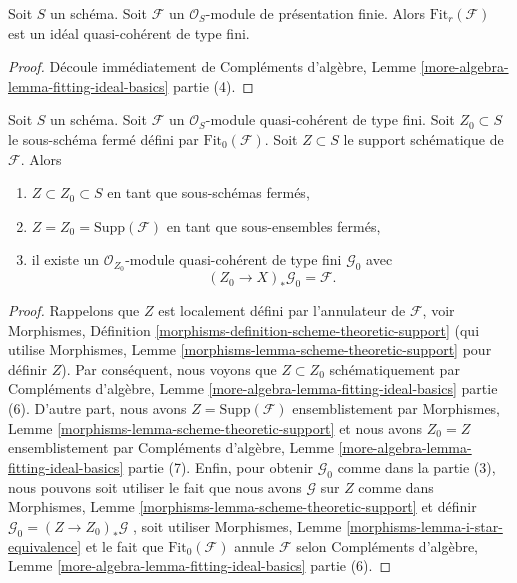 \begin{lemma}
\label{lemma-fitting-ideal-of-finitely-presented}
Soit  $S$  un schéma. Soit  $\mathcal{F}$  un  $\mathcal{O}_S$-module de
présentation finie. Alors  $\text{Fit}_r(\mathcal{F})$  est un idéal quasi-cohérent de type fini.
\end{lemma}

\begin{proof}
Découle immédiatement de Compléments d'algèbre, Lemme  \ref{more-algebra-lemma-fitting-ideal-basics}  partie (4).
\end{proof}

\begin{lemma}
\label{lemma-on-subscheme-cut-out-by-Fit-0}
Soit  $S$  un schéma. Soit  $\mathcal{F}$  un  $\mathcal{O}_S$-module
quasi-cohérent de type fini. Soit  $Z_0 \subset S$  le sous-schéma fermé défini par
 $\text{Fit}_0(\mathcal{F})$. Soit  $Z \subset S$  le support schématique de  $\mathcal{F}$. Alors
\begin{enumerate}
\item $Z \subset Z_0 \subset S$  en tant que sous-schémas fermés,
\item $Z = Z_0 = \text{Supp}(\mathcal{F})$  en tant que sous-ensembles fermés,
\item il existe un  $\mathcal{O}_{Z_0}$-module quasi-cohérent de type fini  $\mathcal{G}_0$  avec
$$
(Z_0 \to X)_*\mathcal{G}_0 = \mathcal{F}.
$$
\end{enumerate}
\end{lemma}

\begin{proof}
Rappelons que  $Z$  est localement défini par l'annulateur de  $\mathcal{F}$,
voir Morphismes, Définition  \ref{morphisms-definition-scheme-theoretic-support}  (qui utilise Morphismes, Lemme
 \ref{morphisms-lemma-scheme-theoretic-support}  pour définir  $Z$). Par conséquent, nous voyons que
 $Z \subset Z_0$  schématiquement par Compléments d'algèbre, Lemme  \ref{more-algebra-lemma-fitting-ideal-basics}  partie (6).
D'autre part, nous avons  $Z = \text{Supp}(\mathcal{F})$  ensemblistement par Morphismes, Lemme
 \ref{morphisms-lemma-scheme-theoretic-support}  et nous avons  $Z_0 = Z$  ensemblistement par Compléments d'algèbre, Lemme
 \ref{more-algebra-lemma-fitting-ideal-basics}  partie (7). Enfin, pour obtenir  $\mathcal{G}_0$  comme dans la partie
(3), nous pouvons soit utiliser le fait que nous avons  $\mathcal{G}$  sur
 $Z$  comme dans Morphismes, Lemme  \ref{morphisms-lemma-scheme-theoretic-support}  et définir  $\mathcal{G}_0 = (Z \to Z_0)_*\mathcal{G}$ ,
soit utiliser Morphismes, Lemme  \ref{morphisms-lemma-i-star-equivalence}  et le fait que  $\text{Fit}_0(\mathcal{F})$  annule
 $\mathcal{F}$  selon Compléments d'algèbre, Lemme  \ref{more-algebra-lemma-fitting-ideal-basics}  partie (6).
\end{proof}

